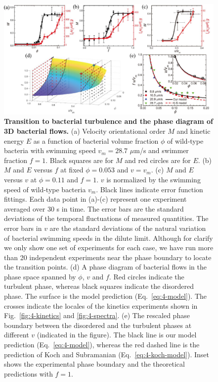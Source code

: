 \begin{figure}[!ht]
	\begin{center}
	\includegraphics[width=5.5 in]{Figs/4-Emergence/2.pdf}
	\end{center}
	\caption[Transition to bacterial turbulence and the phase diagram of 3D bacterial flows]
	{
	\textbf{Transition to bacterial turbulence and the phase diagram of 3D bacterial flows.}
   (a) Velocity orientational order $M$ and kinetic energy $E$ as a function of bacterial volume fraction $\phi$ of wild-type bacteria with swimming speed $v_m = 28.7$ $\mu$m/s and swimmer fraction $f = 1$. Black squares are for $M$ and red circles are for $E$.
   (b) $M$ and $E$ versus $f$ at fixed $\phi= 0.053$ and $v = v_m$.
   (c) $M$ and $E$ versus $v$ at $\phi = 0.11$ and $f = 1$. $v$ is normalized by the swimming speed of wild-type bacteria $v_m$. Black lines indicate error function fittings. Each data point in (a)-(c) represent one experiment averaged over 30 s in time. The error bars are the standard deviations of the temporal fluctuations of measured quantities. The error bars in $v$ are the standard deviations of the natural variation of bacterial swimming speeds in the dilute limit. Although for clarify we only show one set of experiments for each case, we have run more than 20 independent experiments near the phase boundary to locate the transition points.
   (d) A phase diagram of bacterial flows in the phase space spanned by $\phi$, $v$ and $f$. Red circles indicate the turbulent phase, whereas black squares indicate the disordered phase. The surface is the model prediction (Eq.~\ref{eq:4-model}). The crosses indicate the locales of the kinetics experiments shown in Fig.~\ref{fig:4-kinetics} and \ref{fig:4-spectra}.
   (e) The rescaled phase boundary between the disordered and the turbulent phases at different $v$ (indicated in the figure). The black line is our model prediction (Eq.~\ref{eq:4-model}), whereas the red dashed line is the prediction of Koch and Subramanian (Eq.~\ref{eq:4-koch-model}). Inset shows the experimental phase boundary and the theoretical predictions with $f = 1$.
	}
	\label{fig:4-transition}
\end{figure}

